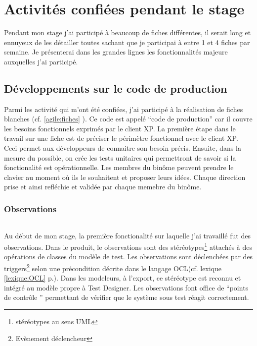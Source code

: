 \chapter{Activités confiées pendant le stage}
Pendant mon stage j'ai participé à beaucoup de fiches différentes, il serait long et ennuyeux de les détailler toutes sachant que je participai à entre 1 et 4 fiches par semaine. Je présenterai dans les grandes lignes les fonctionnalités majeure auxquelles j'ai participé. 

\section{Développements sur le code de production}
Parmi les activité qui m'ont été confiées, j'ai participé à la réalisation de fiches blanches (cf. \ref{agile:fiches} \pageref{agile:fiches}). Ce code est appelé ``code de production'' car il couvre les besoins fonctionnels exprimés par le client XP. La première étape dans le travail sur une fiche est de préciser le périmètre fonctionnel avec le client XP. Ceci permet aux développeurs de connaitre son besoin précis. Ensuite, dans la mesure du possible, on crée les tests unitaires qui permettront de savoir si la fonctionalité est opérationnelle. Les membres du binôme peuvent prendre le clavier au moment où ils le souhaitent et proposer leurs idées. Chaque direction prise et ainsi refléchie et validée par chaque memebre du binôme.

\subsection{Observations}

\subparagraph*{}
Au début de mon stage, la première fonctionalité sur laquelle j'ai travaillé fut des observations. Dans le produit, le observations sont des stéréotypes\footnote{stéréotypes au sens UML} attachés à des opérations de classes du modèle de test. Les observations sont déclenchées par des triggers\footnote{Evènement déclencheur} selon une précondition décrite dans le langage OCL(cf. lexique \ref{lexique:OCL} p.\pageref{lexique:OCL}). Dans les modeleurs, à l'export, ce stéréotype est reconnu et intégré au modèle propre à Test Designer. Les observations font office de ``points de contrôle '' permettant de vérifier que le système sous test réagit correctement.

